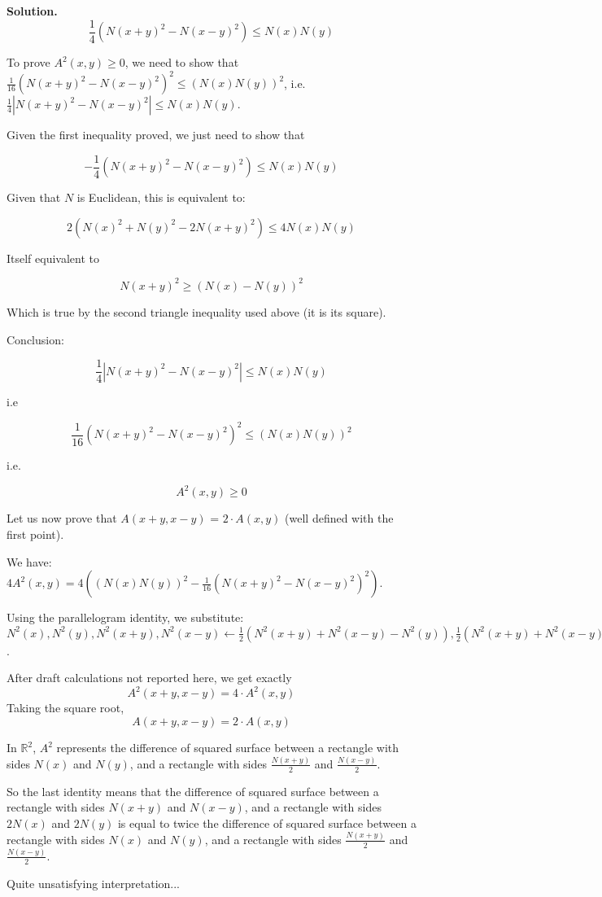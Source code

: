 \documentclass[12pt]{article}
\newcommand{\R}{\mathbb{R}}
\newenvironment{solution}{\vspace{0.2cm} \textbf{Solution.}}{}
\begin{document}
\begin{enumerate}[label=(\alph*)]
\begin{solution}
		$$
		\frac{1}{4} (N(x+y)^2 - N(x-y)^2) \leqslant N(x) N(y)
		$$
		
		To prove $A^2(x,y) \geqslant 0$, we need to show that $\frac{1}{16} (N(x+y)^2 - N(x-y)^2)^2 \leqslant (N(x) N(y))^2$, i.e.\ $\frac{1}{4} | N(x+y)^2 - N(x-y)^2 | \leqslant N(x) N(y)$.
		
		Given the first inequality proved, we just need to show that 
		
		$$- \frac{1}{4} (N(x+y)^2 - N(x-y)^2) \leqslant N(x) N(y)$$
		
		Given that $N$ is Euclidean, this is equivalent to:
		
		$$ 2 ( N(x)^2 + N(y)^2 - 2 N(x+y)^2) \leqslant 4 N(x) N(y)$$
		
		Itself equivalent to
		
		$$ N(x+y)^2 \geqslant (N(x) - N(y))^2$$
		
		Which is true by the second triangle inequality used above (it is its square).
		
		Conclusion:
		
		$$\frac{1}{4} | N(x+y)^2 - N(x-y)^2 | \leqslant N(x) N(y)$$
		
		i.e\
		
		$$\frac{1}{16} (N(x+y)^2 - N(x-y)^2)^2 \leqslant (N(x) N(y))^2$$
		
		i.e.\
		
		$$A^2(x,y) \geqslant 0$$
		
		Let us now prove that $A(x + y, x - y)$ = $2 \cdot A(x, y)$ (well defined with the first point).
		
		We have: $4 A^2(x,y)  = 4((N(x) N(y))^2 - \frac{1}{16} (N(x+y)^2 - N(x-y)^2)^2)$.
		
		Using the parallelogram identity, we substitute: $N^2(x), N^2(y), N^2(x+y), N^2(x-y) \leftarrow \frac{1}{2} (N^2(x+y) + N^2(x-y) - N^2(y)), \frac{1}{2} (N^2(x+y) + N^2(x-y) - N^2(x)), 2(N^2(x) + N^2(y)) - N^2(x-y), 2(N^2(x) + N^2(y)) - N^2(x+y)$.
		
		After draft calculations not reported here, we get exactly $$A^2(x + y, x - y) = 4 \cdot A^2(x, y) $$
		Taking the square root, $$A(x + y, x - y) = 2 \cdot A(x, y)$$

		In $\R^2$, $A^2$ represents the difference of squared surface between a rectangle with sides $N(x)$ and $N(y)$, and a rectangle with sides $\frac{N(x+y)}{2}$ and $\frac{N(x-y)}{2}$.
		
		So the last identity means that the difference of squared surface between a rectangle with sides $N(x+y)$ and $N(x-y)$, and a rectangle with sides $2N(x)$ and $2N(y)$ is equal to twice the difference of squared surface between a rectangle with sides $N(x)$ and $N(y)$, and a rectangle with sides $\frac{N(x+y)}{2}$ and $\frac{N(x-y)}{2}$.
		
		Quite unsatisfying interpretation...
		
		\end{solution}
	\end{enumerate}
	
\end{document}
